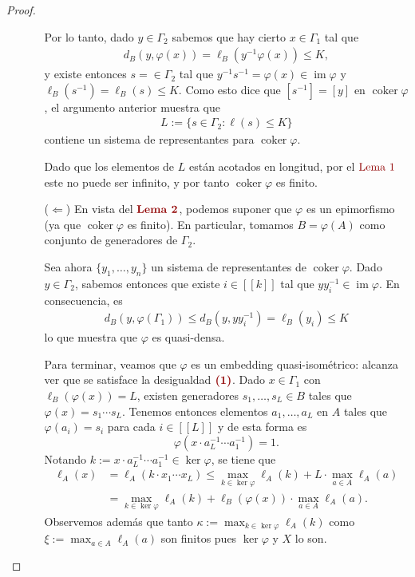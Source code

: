 \documentclass[11pt]{article}
\theoremstyle{colored}
\newcommand{\nat}[1]{[\![#1]\!]}
\newcommand{\im}{\operatorname{im}}
\newcommand{\coker}{\operatorname{coker}}
\newcommand{\paint}[1]{\color{color}{#1}}
\newcommand{\tpaint}[1]{\paint{\textbf{#1}}}
\begin{document}
\begin{proof}
\begin{itemize}[listparindent = \parindent]
\begin{itemize}[listparindent = \parindent]
Por lo tanto, dado $y \in \Gamma_2$ sabemos que hay cierto $x \in \Gamma_1$ tal que 
\begin{align*}
d_B(y, \varphi(x)) = \ell_B(y^{-1}\varphi(x)) \leq K,
\end{align*}
y existe entonces $s  = \in \Gamma_2$ tal que $y^{-1}s^{-1} = \varphi(x) \in \im \varphi$ y $\ell_B(s^{-1}) = \ell_B(s) \leq K$. Como esto dice que $[s^{-1}] = [y]$ en $\coker \varphi$, el argumento anterior muestra que
\begin{align*}
L := \{s \in \Gamma_2 : \ell(s) \leq K \}
\end{align*}
contiene un sistema de representantes para $\coker \varphi$. 

Dado que los elementos de $L$ están acotados en longitud, por el $\paint{\text{Lema $1$}}$ este no puede ser infinito, y por tanto $\coker \varphi$ es finito. 
\item[($\Leftarrow$)] En vista del $\tpaint{Lema 2}$, podemos suponer que $\varphi$ es un epimorfismo (ya que $\coker \varphi$ es finito). En particular, tomamos $B = \varphi(A)$ como conjunto de generadores de $\Gamma_2$. 

Sea ahora $\{y_1, \dots, y_n\}$ un sistema de representantes de $\coker \varphi$. Dado $y \in \Gamma_2$, sabemos entonces que existe $i \in \nat{k}$ tal que $yy_i^{-1} \in \im \varphi$. En consecuencia, es
\begin{align*}
d_B(y,\varphi(\Gamma_1)) \leq d_B(y,yy_i^{-1}) = \ell_B(y_i) \leq K
\end{align*}
lo que muestra que $\varphi$ es quasi-densa.

Para terminar, veamos que $\varphi$ es un embedding quasi-isométrico: alcanza ver que se satisface la desigualdad $\tpaint{(1)}$. Dado $x \in \Gamma_1$ con $\ell_B(\varphi(x)) = L$, existen generadores $s_1, \dots, s_L \in B$ tales que $\varphi(x) = s_1 \cdots s_L$. Tenemos entonces elementos $a_1, \dots, a_L$ en $A$ tales que $\varphi(a_i) = s_i$ para cada $i \in \nat{L}$ y de esta forma es
\[
\varphi(x \cdot a_L^{-1} \cdots a_1^{-1}) = 1.
\]
Notando $k := x \cdot a_L^{-1} \cdots a_1^{-1} \in \ker \varphi$, se tiene que
\begin{align*}
\ell_A(x) &= \ell_A(k \cdot x_1 \cdots x_L) \leq \max_{k \in \ker \varphi}\ell_A(k) + L \cdot \max_{a \in A}\ell_A(a)\\ &= \max_{k \in \ker \varphi}\ell_A(k) + \ell_B(\varphi(x)) \cdot \max_{a \in A}\ell_A(a). 
\end{align*}
Observemos  además que tanto $\kappa := \max_{k \in \ker \varphi}\ell_A(k)$ como $\xi := \max_{a \in A}\ell_A(a)$ son finitos pues $\ker \varphi$ y $X$ lo son. 


\end{itemize}
\end{itemize}
\end{proof}
\end{document}
